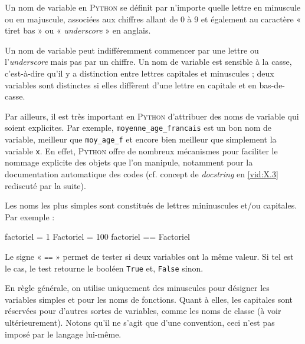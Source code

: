 Un nom de variable en \textsc{Python} se définit par n'importe quelle lettre en minuscule ou en majuscule, associées aux chiffres allant de 0 à 9 et également au caractère « tiret bas » ou « \textit{underscore} » en anglais. 

Un nom de variable peut indifféremment commencer par une lettre ou l'\textit{underscore} mais pas par un chiffre. 
Un nom de variable est sensible à la casse, c'est-à-dire qu'il y a distinction entre lettres capitales et minuscules ; deux variables sont distinctes si elles diffèrent d'une lettre en capitale et en bas-de-casse.

Par ailleurs, il est très important en \textsc{Python} d'attribuer des noms de variable qui soient explicites. Par exemple, \texttt{moyenne\_age\_francais} est un bon nom de variable, meilleur que \texttt{moy\_age\_f} et encore bien meilleur que simplement la variable \texttt{x}. En effet, \textsc{Python} offre de nombreux mécanismes pour faciliter le nommage explicite des objets que l'on manipule, notamment pour la documentation automatique des codes (cf. concept de \textit{docstring} en \cref{vid:X.3} rediscuté par la suite).

Les noms les plus simples sont constitués de lettres mininuscules et/ou capitales. Par exemple :

\begin{nbjupyterin}[before skip=6pt, after skip=8pt]{}
factoriel = 1
Factoriel = 100
factoriel == Factoriel
\end{nbjupyterin}

Le signe « \texttt{==} » permet de tester si deux variables ont la même valeur. Si tel est le cas, le test retourne le booléen \texttt{True} et, \texttt{False} sinon.

\vspace{-.25\baselineskip}
\vspace{-0.1\baselineskip}

%
En règle générale, on utilise uniquement des minuscules pour désigner les variables simples et pour les noms de fonctions. Quant à elles, les capitales sont réservées pour d'autres sortes de variables, comme les noms de classe (à voir ultérieurement).
Notons qu'il ne s'agit que d'une convention, ceci n'est pas imposé par le langage lui-même.


